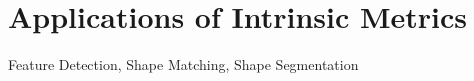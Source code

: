 \chapter{Applications of Intrinsic Metrics}
\label{chapter:shapeMatching}

Feature Detection, Shape Matching, Shape Segmentation
